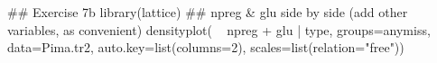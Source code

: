 \begin{enumerate}
\begin{itemize}
\begin{fullwidth}
\begin{Schunk}
\begin{Sinput}
## Exercise 7b
library(lattice)
## npreg & glu side by side (add other variables, as convenient)
densityplot( ~ npreg + glu | type, groups=anymiss, data=Pima.tr2,
            auto.key=list(columns=2), scales=list(relation="free"))
\end{Sinput}
\end{Schunk}

\end{fullwidth}
\end{itemize}
\end{enumerate}
